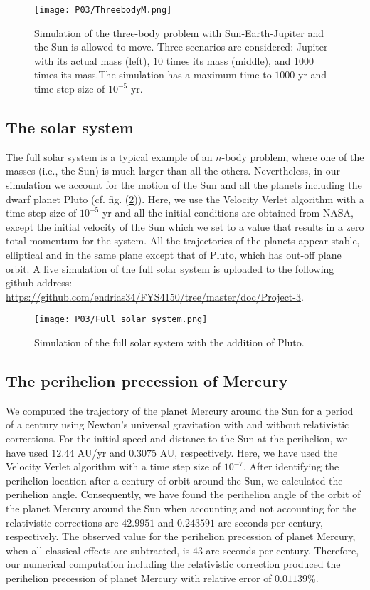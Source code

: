 \documentclass[a4paper]{article}
\begin{document}
\begin{figure}
  \centering
  \texttt{[image: P03/ThreebodyM.png]}
  \caption{Simulation of the three-body problem with Sun-Earth-Jupiter and the Sun is allowed to move. Three scenarios are considered: Jupiter with its actual mass (left), $10$ times its mass (middle), and $1000$ times its mass.The simulation has a maximum time to $1000$ yr and time step size of $10^{-5}$ yr.}
   \label{ThreebodyM}
\end{figure}

\subsection{The solar system}
The full solar system is a typical example of an $n$-body problem, where one of the masses (i.e., the Sun) is much larger than all the others. Nevertheless, in our simulation we account for the motion of the Sun and all the planets including the dwarf planet Pluto (cf. fig. (\ref{Full_solar_system})). Here, we use the Velocity Verlet algorithm with a time step size of $10^{-5}$ yr and all the initial conditions are obtained from NASA, except the initial velocity of the Sun which we set to a value that results in a zero total momentum for the system. All the trajectories of the planets appear stable, elliptical and in the same plane except that of Pluto, which has out-off plane orbit. A live simulation of the full solar system is uploaded to the following github address: \url{https://github.com/endrias34/FYS4150/tree/master/doc/Project-3}.

\begin{figure}
  \centering
  \texttt{[image: P03/Full\_solar\_system.png]}
  \caption{Simulation of the full solar system with the addition of Pluto.}
   \label{Full_solar_system}
\end{figure}

\subsection{The perihelion precession of Mercury}
We computed the trajectory of the planet Mercury around the Sun for a period of a century using Newton's universal gravitation with and without relativistic corrections. For the initial speed and distance to the Sun at the perihelion, we have used $12.44$ AU/yr and $0.3075$ AU, respectively. Here, we have used the Velocity Verlet algorithm with a time step size of $10^{-7}$. After identifying the perihelion location after a century of orbit around the Sun, we calculated the perihelion angle. Consequently, we have found the perihelion angle of the orbit of the planet Mercury around the Sun when accounting and not accounting for the relativistic corrections are $42.9951$ and $0.243591$ arc seconds per century, respectively. The observed value for the perihelion precession of planet Mercury, when all classical effects are subtracted, is $43$ arc seconds per century. Therefore, our numerical computation including the relativistic correction produced the perihelion precession of planet Mercury with relative error of $0.01139\%$.
\end{document}
